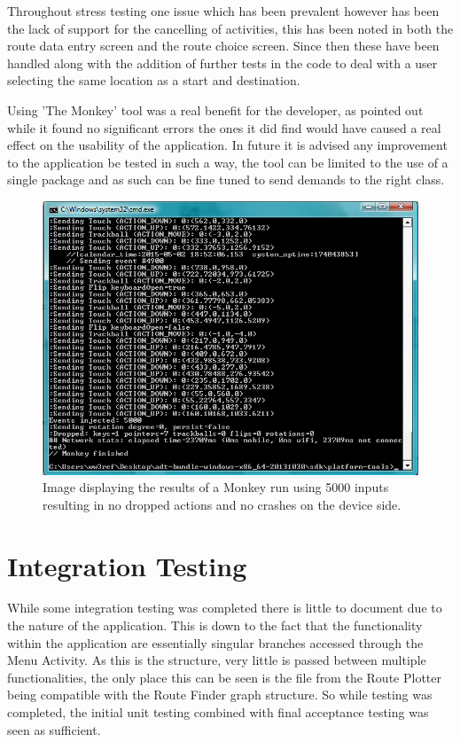 Throughout stress testing one issue which has been prevalent however has been the lack of support for the cancelling of activities, this has been noted in both the route data entry screen and the route choice screen. Since then these have been handled along with the addition of further tests in the code to deal with a user selecting the same location as a start and destination. 

Using 'The Monkey' tool was a real benefit for the developer, as pointed out while it found no significant errors the ones it did find would have caused a real effect on the usability of the application. In future it is advised any improvement to the application be tested in such a way, the tool can be limited to the use of a single package and as such can be fine tuned to send demands to the right class. 

\begin{figure}[H]
\includegraphics[scale=0.5]{Chapter4/monkey.png} 
\caption[Monkey Stress Test]{Image displaying the results of a Monkey run using 5000 inputs resulting in no dropped actions and no crashes on the device side.}
\end{figure}

\section{Integration Testing}
While some integration testing was completed there is little to document due to the nature of the application. This is down to the fact that the functionality within the application are essentially singular branches accessed through the Menu Activity. As this is the structure, very little is passed between multiple functionalities, the only place this can be seen is the file from the Route Plotter being compatible with the Route Finder graph structure. So while testing was completed, the initial unit testing combined with final acceptance testing was seen as sufficient.
